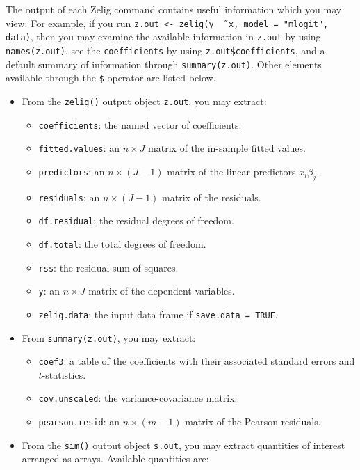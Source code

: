 The output of each Zelig command contains useful information which you
may view.  For example, if you run \texttt{z.out <- zelig(y \~\,
  x, model = "mlogit", data)}, then you may examine the available
information in \texttt{z.out} by using \texttt{names(z.out)},
see the {\tt coefficients} by using {\tt z.out\$coefficients}, and
a default summary of information through \texttt{summary(z.out)}.
Other elements available through the {\tt \$} operator are listed
below.

\begin{itemize}
\item From the {\tt zelig()} output object {\tt z.out}, you may
  extract:
   \begin{itemize}
   \item {\tt coefficients}: the named vector of coefficients.   
   \item {\tt fitted.values}: an $n \times J$ matrix of the in-sample
     fitted values.
   \item {\tt predictors}: an $n \times (J-1)$ matrix of the linear
     predictors $x_i \beta_j$.
   \item {\tt residuals}: an $n \times (J-1)$ matrix of the residuals.  
   \item {\tt df.residual}: the residual degrees of freedom.  
   \item {\tt df.total}: the total degrees of freedom.
   \item {\tt rss}: the residual sum of squares.  
   \item {\tt y}: an $n \times J$ matrix of the dependent variables.
   \item {\tt zelig.data}: the input data frame if {\tt save.data = TRUE}.  
   \end{itemize}

\item From {\tt summary(z.out)}, you may extract:
\begin{itemize}
  \item {\tt coef3}: a table of the coefficients with their associated
    standard errors and $t$-statistics.
  \item {\tt cov.unscaled}: the variance-covariance matrix. 
  \item {\tt pearson.resid}: an $n \times (m-1)$ matrix of the Pearson residuals.  
\end{itemize}

\item From the {\tt sim()} output object {\tt s.out}, you may extract
  quantities of interest arranged as arrays.  Available quantities
  are:  


\end{itemize}
